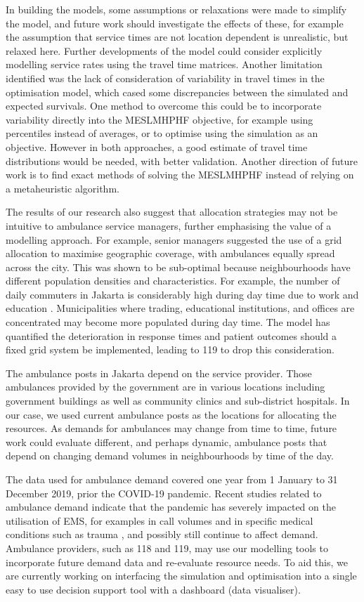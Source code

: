 \documentclass[numbers,webpdf,imaman]{ima-authoring-template}%
\begin{document}
In building the models, some assumptions or relaxations were
made to simplify the model, and future work should investigate the effects of
these, for example the assumption that service times are not location dependent
is unrealistic, but relaxed here. Further developments of the model could
consider explicitly modelling service rates using the travel time matrices.
Another limitation identified was the lack of consideration of variability in
travel times in the optimisation model, which cased some discrepancies between
the simulated and expected survivals. One method to overcome this could be to
incorporate variability directly into the MESLMHPHF objective, for example using
percentiles instead of averages, or to optimise using the simulation as an
objective. However in both approaches, a good estimate of travel time
distributions would be needed, with better validation.
Another direction of future work is to find exact methods of solving the
MESLMHPHF instead of relying on a metaheuristic algorithm.

The results of our research also suggest that allocation strategies may not be
intuitive to ambulance service managers, further emphasising the value of a
modelling approach. For example, senior managers suggested the use of a grid
allocation to maximise geographic coverage, with ambulances equally spread
across the city. This was shown to be sub-optimal because neighbourhoods have
different population densities and characteristics. For example, the number of
daily commuters in Jakarta is considerably high during day time due to work
and education \citep{BPS_Jakarta_migrasi}. Municipalities where trading,
educational institutions, and offices are concentrated may become more
populated during day time. The model has quantified the deterioration in
response times and patient outcomes should a fixed grid system be implemented,
leading to 119 to drop this consideration.

The ambulance posts in Jakarta depend on the service provider. Those
ambulances provided by the government are in various locations including
government buildings as well as community clinics and sub-district hospitals.
In our case, we used current ambulance posts as the locations for allocating
the resources. As demands for ambulances may change from time to time, future
work could evaluate different, and perhaps dynamic, ambulance posts that
depend on changing demand volumes in neighbourhoods by time of the day.

The data used for ambulance demand covered one year from 1 January to 31
December 2019, prior the COVID-19 pandemic. Recent studies related to
ambulance demand indicate that the  pandemic has severely impacted on the
utilisation of EMS, for examples in call volumes \citep{csan2021effects} and in
specific medical conditions such as trauma \citep{azbel2021effects}, and
possibly still continue to affect demand. Ambulance providers, such as 118 and
119, may use our modelling tools to incorporate future demand data and
re-evaluate resource needs. To aid this, we are currently working on
interfacing the simulation and optimisation into a single easy to use decision
support tool with a dashboard (data visualiser). 
\end{document}
